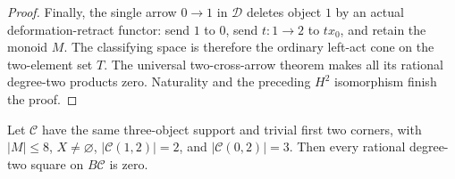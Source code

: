\begin{proof}
Finally, the single arrow $0\to1$ in $\mathcal D$ deletes object
$1$ by an actual deformation-retract functor: send $1$ to $0$,
send $t:1\to2$ to $tx_0$, and retain the monoid $M$.
The classifying space is therefore the ordinary left-act cone on
the two-element set $T$.  The universal two-cross-arrow theorem
makes all its rational degree-two products zero.  Naturality and
the preceding $H^2$ isomorphism finish the proof.
\end{proof}

\begin{proposition}\label{C:two-by-three-incoming-small-endpoint}
Let $\mathcal C$ have the same three-object support and trivial
first two corners, with $|M|\le8$, $X\ne\varnothing$,
$|\mathcal C(1,2)|=2$, and $|\mathcal C(0,2)|=3$.
Then every rational degree-two square on $B\mathcal C$ is zero.
\end{proposition}

